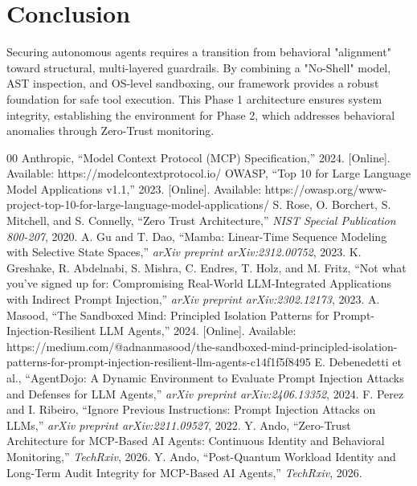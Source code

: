 \documentclass[conference]{IEEEtran}
\begin{document}
\section{Conclusion}
Securing autonomous agents requires a transition from behavioral "alignment" toward structural, multi-layered guardrails. By combining a "No-Shell" model, AST inspection, and OS-level sandboxing, our framework provides a robust foundation for safe tool execution. This Phase 1 architecture ensures system integrity, establishing the environment for Phase 2, which addresses behavioral anomalies through Zero-Trust monitoring.

\begin{thebibliography}{00}
 Anthropic, ``Model Context Protocol (MCP) Specification,'' 2024. [Online]. Available: https://modelcontextprotocol.io/
 OWASP, ``Top 10 for Large Language Model Applications v1.1,'' 2023. [Online]. Available: https://owasp.org/www-project-top-10-for-large-language-model-applications/
 S. Rose, O. Borchert, S. Mitchell, and S. Connelly, ``Zero Trust Architecture,'' \textit{NIST Special Publication 800-207}, 2020.
 A. Gu and T. Dao, ``Mamba: Linear-Time Sequence Modeling with Selective State Spaces,'' \textit{arXiv preprint arXiv:2312.00752}, 2023.
 K. Greshake, R. Abdelnabi, S. Mishra, C. Endres, T. Holz, and M. Fritz, ``Not what you've signed up for: Compromising Real-World LLM-Integrated Applications with Indirect Prompt Injection,'' \textit{arXiv preprint arXiv:2302.12173}, 2023.
 A. Masood, ``The Sandboxed Mind: Principled Isolation Patterns for Prompt-Injection-Resilient LLM Agents,'' 2024. [Online]. Available: https://medium.com/@adnanmasood/the-sandboxed-mind-principled-isolation-patterns-for-prompt-injection-resilient-llm-agents-c14f1f5f8495
 E. Debenedetti et al., ``AgentDojo: A Dynamic Environment to Evaluate Prompt Injection Attacks and Defenses for LLM Agents,'' \textit{arXiv preprint arXiv:2406.13352}, 2024.
 F. Perez and I. Ribeiro, ``Ignore Previous Instructions: Prompt Injection Attacks on LLMs,'' \textit{arXiv preprint arXiv:2211.09527}, 2022.
 Y. Ando, ``Zero-Trust Architecture for MCP-Based AI Agents: Continuous Identity and Behavioral Monitoring,'' \textit{TechRxiv}, 2026.
 Y. Ando, ``Post-Quantum Workload Identity and Long-Term Audit Integrity for MCP-Based AI Agents,'' \textit{TechRxiv}, 2026.
\end{thebibliography}
\end{document}
